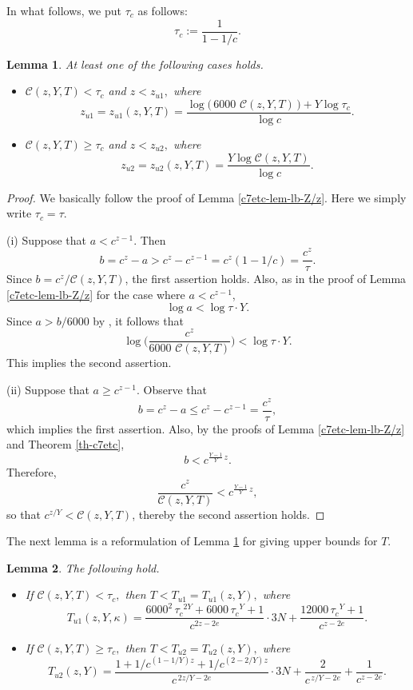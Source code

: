 \documentclass[11pt]{amsart}
\newtheorem{lem}{Lemma}[section]
\numberwithin{equation}{section}
\begin{document}
In what follows, we put $\tau_c$ as follows:
\[
\tau_c:=\frac{1}{1-1/c}.%
\]

\begin{lem}\label{c7-lem-z-ub}
At least one of the following cases holds.
\begin{itemize}
\item[\rm (i)]
${\mathcal C}(z,Y,T)<\tau_c$ and $z<z_{u1},$ where
\[
z_{u1}=z_{u1}(z,Y,T)=
\frac{
\log \bigr(\,6000\,\,{\mathcal C}(z,Y,T)\,\big) + Y \log \tau_c
}
{\log c}.
\]
%
\item[\rm (ii)]
${\mathcal C}(z,Y,T) \ge \tau_c$ and $z<z_{u2},$ where
\[
z_{u2}=z_{u2}(z,Y,T)=
\frac{Y \log {\mathcal C}(z,Y,T)}{\log c}.
\]
\end{itemize}
\end{lem}

\begin{proof}
We basically follow the proof of Lemma \ref{c7etc-lem-lb-Z/z}.
Here we simply write $\tau_c=\tau$.\par
%
(i) Suppose that $a<c^{z-1}$.
Then 
\[
b=c^z-a>c^z-c^{z-1}=c^z(1-1/c)=\frac{c^z}{\tau}.
\]
Since $b=c^z/{\mathcal C}(z,Y,T)$, the first assertion holds.
Also, as in the proof of Lemma \ref{c7etc-lem-lb-Z/z} for the case where $a<c^{z-1}$, 
\[
\log a < \log \tau \cdot Y.
\]
Since $a>b/6000$ by \cite[Theorem 1.4]{Be}, it follows that 
\[
\log \biggr(\frac{c^z}{6000\,\,{\mathcal C}(z,Y,T)}\bigg) < \log \tau \cdot Y.
\] 
This implies the second assertion.
\par
(ii) Suppose that $a \ge c^{z-1}$.
Observe that
\[
b=c^z-a \le c^z-c^{z-1}=\frac{c^z}{\tau},
\]
which implies the first assertion.
Also, by the proofs of Lemma \ref{c7etc-lem-lb-Z/z} and Theorem \ref{th-c7etc}, 
\[
b<c^{\frac{Y-1}{Y}\,z}.
\]
Therefore,
\[
\frac{c^z}{{\mathcal C}(z,Y,T)} < c^{\frac{Y-1}{Y}\,z},
\] 
so that $c^{z/Y}<{\mathcal C}(z,Y,T)$, thereby the second assertion holds.
\end{proof}

The next lemma is a reformulation of Lemma \ref{c7-lem-z-ub} for giving upper bounds for $T$.

\begin{lem}\label{c7-lem-Tu}
The following hold.
\begin{itemize}
\item[\rm (i)]
If ${\mathcal C}(z,Y,T)<\tau_c,$ then $T<T_{u1}=T_{u1}(z,Y),$ where
\[
T_{u1}(z,Y,\kappa)=\frac{6000^2\,{\tau_c}^{2Y}+6000\,{\tau_c}^Y+1}{c^{2z-2e}} \cdot 3 N
+
\frac{12000\,{\tau_c}^Y+1}{c^{z-2e} }.
\]
%
\item[\rm (ii)]
If ${\mathcal C}(z,Y,T) \ge \tau_c,$ then $T<T_{u2}=T_{u2}(z,Y),$ where
\[
T_{u2}(z,Y)=\frac{1+1/c^{(1-1/Y)z}+1/c^{(2-2/Y)z}}{c^{\,2z/Y-2e}} \cdot 3N
+
\frac{2}{c^{\,z/Y-2e} } + \frac{1}{c^{z-2e} }.
\]
\end{itemize}
\end{lem}
\end{document}
